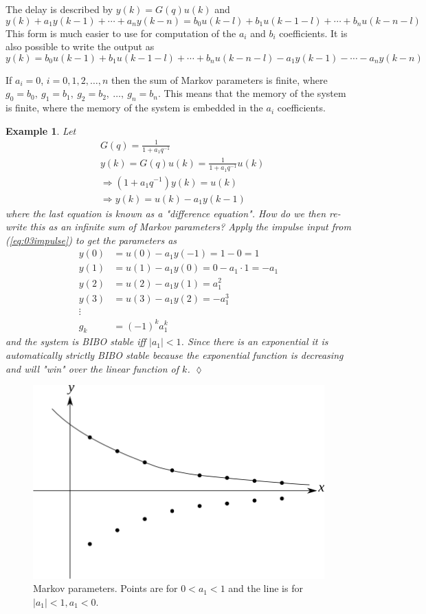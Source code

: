 \documentclass[lecture,12pt,]{pcms-l}
\theoremstyle{example}
\newtheorem{example}{Example}[section]
\begin{document}
The delay is described by $y(k) = G(q)u(k)$ and
$$y(k) + a_1y(k-1)+\cdots + a_ny(k-n) = b_0u(k-l)+b_1u(k-1-l) + \cdots + b_nu(k-n-l)$$
This form is much easier to use for computation of the $a_i$ and $b_i$ coefficients. It is also possible to write the output as
$$y(k) = b_0u(k-1) + b_1u(k-1-l) + \cdots + b_nu(k-n-l) - a_1y(k-1) - \cdots - a_ny(k-n)$$

If $a_i=0$, $i=0,1,2,\ldots,n$ then the sum of Markov parameters is finite, where $g_0=b_0, ~g_1=b_1, ~g_2=b_2, ~\ldots, ~g_n=b_n$. This means that the memory of the system is finite, where the memory of the system is embedded in the $a_i$ coefficients.

\begin{example}
Let
\begin{align*}
&G(q) = \frac{1}{1+a_1q^{-1}} \\
&y(k) = G(q)u(k) = \frac{1}{1+a_1q^{-1}}u(k) \\
&\Rightarrow (1+a_1q^{-1})y(k) = u(k) \\
&\Rightarrow y(k) = u(k) - a_1y(k-1)
\end{align*}
where the last equation is known as a "difference equation". How do we then re-write this as an infinite sum of Markov parameters? Apply the impulse input from (\ref{eq:03impulse}) to get the parameters as
\begin{align*}
y(0) &= u(0) - a_1y(-1) = 1-0 = 1 \\
y(1) &= u(1) - a_1y(0) = 0 - a_1 \cdot 1 = -a_1 \\
y(2) &= u(2) - a_1y(1) = a_1^2 \\
y(3) &= u(3) - a_1y(2) = -a_1^3 \\
\vdots & \\
g_k &= (-1)^ka_1^k
\end{align*}
and the system is BIBO stable iff $|a_1|<1$. Since there is an exponential it is automatically strictly BIBO stable because the exponential function is decreasing and will "win" over the linear function of $k$.
$\lozenge$
\end{example}
\begin{figure}[ht!]
	\centering
	\includegraphics[width=.5\textwidth]{images/03markovParams}
	\caption{Markov parameters. Points are for $0<a_1<1$ and the line is for $|a_1|<1, a_1<0$.}
	\label{fig:03markovParams}
\end{figure}
\end{document}
